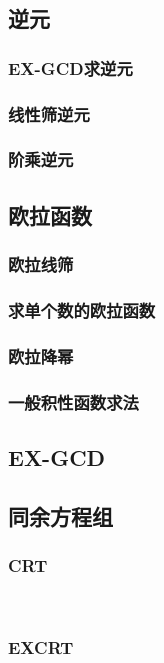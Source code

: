 \documentclass[twocolumn,a4]{article}
\newcommand{\addcpp}[1]{}
\begin{document}
	\subsection{逆元}
		\subsubsection{EX-GCD求逆元}
			\addcpp{math/EXGCD_INV}
		\subsubsection{线性筛逆元}
		\subsubsection{阶乘逆元}
	\subsection{欧拉函数}
		\subsubsection{欧拉线筛}
		\subsubsection{求单个数的欧拉函数}
		\subsubsection{欧拉降幂}
			\addcpp{math/EXEuler}
		\subsubsection{一般积性函数求法}
	\subsection{EX-GCD}
	\subsection{同余方程组}
		\subsubsection{CRT}
​			%
​		\subsubsection{EXCRT}
​			\addcpp{math/EXCRT}
\end{document}
